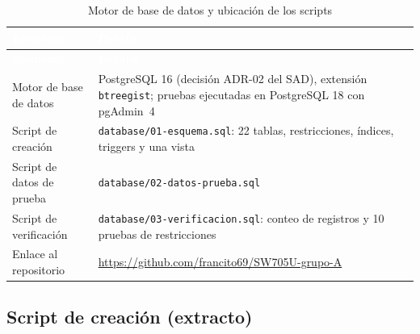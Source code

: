 \documentclass[11pt,a4paper]{article}
\newcommand{\cab}[1]{\textcolor{white}{\textbf{#1}}}
\newcommand{\tb}[1]{{\renewcommand{\_}{\textunderscore\allowbreak}\texttt{#1}}}
\begin{document}
\begin{xltabular}{\linewidth}{|P{4.5cm}|L|}
  \caption{Motor de base de datos y ubicación de los scripts}\label{tab:archivos-sql}\\
  \hline
  \cab{Elemento} & \cab{Detalle} \\ \hline
  \endfirsthead
  \hline
  \cab{Elemento} & \cab{Detalle} \\ \hline
  \endhead
  Motor de base de datos     & PostgreSQL 16 (decisión ADR-02 del SAD), extensión \tb{btree\_gist}; pruebas ejecutadas en PostgreSQL 18 con pgAdmin~4 \\ \hline
  Script de creación         & \nolinkurl{database/01-esquema.sql}: 22 tablas, restricciones, índices, triggers y una vista \\ \hline
  Script de datos de prueba  & \nolinkurl{database/02-datos-prueba.sql} \\ \hline
  Script de verificación     & \nolinkurl{database/03-verificacion.sql}: conteo de registros y 10 pruebas de restricciones \\ \hline
  Enlace al repositorio      & \url{https://github.com/francito69/SW705U-grupo-A} \\ \hline
\end{xltabular}

\subsection{Script de creación (extracto)}
\end{document}
